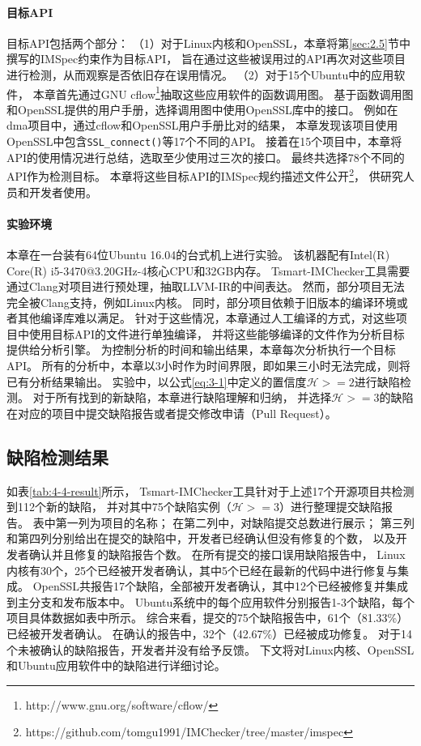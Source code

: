 \paragraph{目标API}
目标API包括两个部分：
（1）对于Linux内核和OpenSSL，本章将第\ref{sec:2.5}节中撰写的IMSpec约束作为目标API，
旨在通过这些被误用过的API再次对这些项目进行检测，从而观察是否依旧存在误用情况。
（2）对于15个Ubuntu中的应用软件，
本章首先通过GNU cflow\footnote{http://www.gnu.org/software/cflow/}抽取这些应用软件的函数调用图。
基于函数调用图和OpenSSL提供的用户手册，选择调用图中使用OpenSSL库中的接口。
例如在dma项目中，通过cflow和OpenSSL用户手册比对的结果，
本章发现该项目使用OpenSSL中包含\texttt{SSL\_connect()}等17个不同的API。
接着在15个项目中，本章将API的使用情况进行总结，选取至少使用过三次的接口。
最终共选择78个不同的API作为检测目标。
本章将这些目标API的IMSpec规约描述文件公开\footnote{https://github.com/tomgu1991/IMChecker/tree/master/imspec}，
供研究人员和开发者使用。




\paragraph{实验环境}
本章在一台装有64位Ubuntu 16.04的台式机上进行实验。
该机器配有Intel(R) Core(R) i5-3470@3.20GHz-4核心CPU和32GB内存。
Tsmart-IMChecker工具需要通过Clang对项目进行预处理，抽取LLVM-IR的中间表达。
然而，部分项目无法完全被Clang支持，例如Linux内核。
同时，部分项目依赖于旧版本的编译环境或者其他编译库难以满足。
针对于这些情况，本章通过人工编译的方式，对这些项目中使用目标API的文件进行单独编译，
并将这些能够编译的文件作为分析目标提供给分析引擎。
为控制分析的时间和输出结果，本章每次分析执行一个目标API。
所有的分析中，本章以3小时作为时间界限，即如果三小时无法完成，则将已有分析结果输出。
实验中，以公式\ref{eq:3-1}中定义的置信度$\mathcal{H} >= 2$进行缺陷检测。
对于所有找到的新缺陷，本章进行缺陷理解和归纳，
并选择$\mathcal{H} >= 3$的缺陷在对应的项目中提交缺陷报告或者提交修改申请（Pull Request）。

\subsection{缺陷检测结果}

如表\ref{tab:4-4-result}所示，
Tsmart-IMChecker工具针对于上述17个开源项目共检测到112个新的缺陷，
并对其中75个缺陷实例（$\mathcal{H} >= 3$）进行整理提交缺陷报告。
表中第一列为项目的名称；
在第二列中，对缺陷提交总数进行展示；
第三列和第四列分别给出在提交的缺陷中，开发者已经确认但没有修复的个数，
以及开发者确认并且修复的缺陷报告个数。
在所有提交的接口误用缺陷报告中，
Linux内核有30个，25个已经被开发者确认，其中5个已经在最新的代码中进行修复与集成。
OpenSSL共报告17个缺陷，全部被开发者确认，其中12个已经被修复并集成到主分支和发布版本中。
Ubuntu系统中的每个应用软件分别报告1-3个缺陷，每个项目具体数据如表中所示。
综合来看，提交的75个缺陷报告中，61个（81.33\%）已经被开发者确认。
在确认的报告中，32个（42.67\%）已经被成功修复。
对于14个未被确认的缺陷报告，开发者并没有给予反馈。
下文将对Linux内核、OpenSSL和Ubuntu应用软件中的缺陷进行详细讨论。

